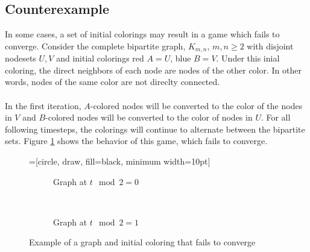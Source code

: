\documentclass[letterpaper, 11pt]{article}
\begin{document}
\subsection{Counterexample} \label{sec:counterexample}
In some cases, a set of initial colorings may result in a game which fails to converge. Consider the complete bipartite graph, $K_{m,n}$, $m,n \geq 2$ with disjoint nodesets $U, V$ and initial colorings red $A=U$, blue $B=V$. Under this inial coloring, the direct neighbors of each node are nodes of the other color. In other words, nodes of the same color are not direclty connected. 
\\\\
In the first iteration, $A$-colored nodes will be converted to the color of the nodes in $V$ and $B$-colored nodes will be converted to the color of nodes in $U$. For all following timesteps, the colorings will continue to alternate between the bipartite sets. Figure \ref{fig:converge} shows the behavior of this game, which fails to converge.

\begin{figure}[h!]   
\begin{center}
=[circle, draw, fill=black, minimum width=10pt]
\begin{subfigure}{.49\textwidth}
\caption{Graph at $t\mod 2 = 0$}
\end{subfigure} \\
\begin{subfigure}{.49\textwidth}
\caption{Graph at $t\mod 2 = 1$}
\end{subfigure}
\caption{Example of a graph and initial coloring that fails to converge}
\label{fig:converge}
\end{center}

\end{figure}
\end{document}
